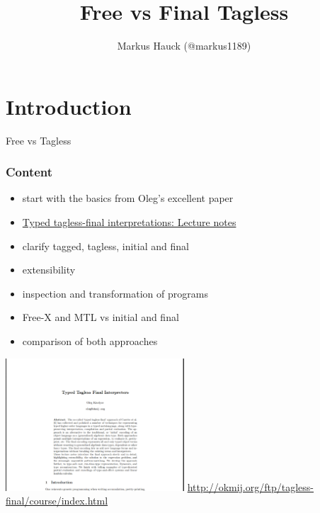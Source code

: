 \documentclass[aspectratio=169, hyperref={colorlinks, linkcolor=beamer@centricgreen}, urlcolor=links]{beamer}
\title{Free vs Final Tagless}
\author{Markus Hauck (@markus1189)}
\begin{document}
\begin{frame}
  \titlepage{}
\end{frame}

\section{Introduction}\label{sec:introduction}

\begin{frame}
  \begin{center}
    {\Huge Free vs Tagless}
  \end{center}
\end{frame}

\begin{frame}[fragile]
  \frametitle{Content}
  \begin{itemize}
  \item start with the basics from Oleg's excellent paper
  \item \href{http://okmij.org/ftp/tagless-final/course/index.html}{Typed tagless-final interpretations: Lecture notes}
  \item clarify tagged, tagless, initial and final
  \item extensibility
  \item inspection and transformation of programs
  \item Free-X and MTL vs initial and final
  \item comparison of both approaches
  \end{itemize}
\end{frame}

\begin{frame}
  \begin{center}
    \includegraphics[width=0.5\textwidth]{static-images/final-tagless.png}
    \vfill
    \href{http://okmij.org/ftp/tagless-final/course/index.html}{http://okmij.org/ftp/tagless-final/course/index.html}
  \end{center}
\end{frame}
\end{document}
